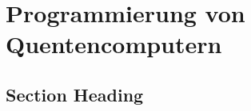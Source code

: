 \chapter{Programmierung von Quentencomputern}
\label{programming} %



\section{Section Heading}


\printbibliography
